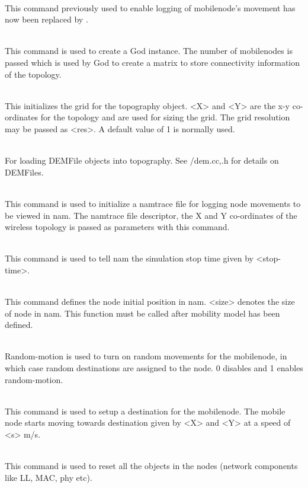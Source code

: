 {\begin{flushleft}
\\
This command previously used to enable logging of mobilenode's movement has now
been replaced by .


\\
This command is used to create a God instance. The number of mobilenodes
is passed which is used by God to create a matrix to store connectivity 
information of the topology.


\\
This initializes the grid for the topography object. <X> and <Y> are the x-y
co-ordinates for the topology and are used for sizing the grid. The grid
resolution may be passed as <res>. A default value of 1 is normally used.


\\
For loading DEMFile objects into topography. See \ns/dem.{cc,.h} for details on
DEMFiles.


\\
This command is used to initialize a namtrace file for logging node movements
to be viewed in nam. The namtrace file descriptor, the X and Y 
co-ordinates of the wireless topology is passed as parameters with this command.


\\
This command is used to tell nam the simulation stop time given by <stop-time>.


\\
This command defines the node initial position in nam. <size> denotes the size
of node in nam. This function must be called after mobility model has been
defined.


\\
Random-motion is used to turn on random movements for the mobilenode, in which
case random destinations are assigned to the node. 0 disables and 1 enables
random-motion.


\\
This command is used to setup a destination for the mobilenode. The mobile
node starts moving towards destination given by <X> and <Y> at a speed of
<s> m/s.


\\
This command is used to reset all the objects in the nodes (network 
components like LL, MAC, phy etc).



\end{flushleft}}
